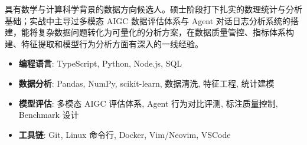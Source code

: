 \documentclass[zh]{resume}
\begin{document}
\begin{tcolorbox}[colback=accentcolor!12, colframe=accentcolor!20,
  arc=0pt, boxrule=0.3pt, left=6pt, right=6pt, top=3pt, bottom=3pt,
  sharp corners]
\makeheader
\end{tcolorbox}

\vspace{0.3em}

具有数学与计算科学背景的数据方向候选人。硕士阶段打下扎实的数理统计与分析基础；实战中主导过多模态 AIGC 数据评估体系与 Agent 对话日志分析系统的搭建，能将复杂数据问题转化为可量化的分析方案，在数据质量管控、指标体系构建、特征提取和模型行为分析方面有深入的一线经验。


\begin{itemize}
    \item \textbf{编程语言}: TypeScript, Python, Node.js, SQL
    \item \textbf{数据分析}: Pandas, NumPy, scikit-learn, 数据清洗, 特征工程, 统计建模
    \item \textbf{模型评估}: 多模态 AIGC 评估体系, Agent 行为对比评测, 标注质量控制, Benchmark 设计
    \item \textbf{工具链}: Git, Linux 命令行, Docker, Vim/Neovim, VSCode
\end{itemize}
\end{document}
